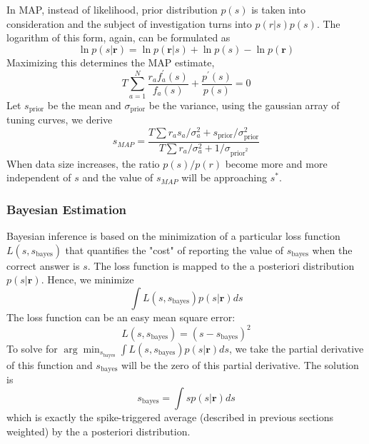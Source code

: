 \documentclass[11pt]{article}
\begin{document}
In MAP, instead of likelihood, prior distribution $p(s)$ is taken into consideration and the subject of investigation turns into $p(r|s)p(s)$. The logarithm of this form, again, can be formulated as
\begin{equation*}
    \ln p(s|\mathbf{r})=\ln p(\mathbf{r}|s)+\ln p(s)-\ln p(\mathbf{r})
\end{equation*}
Maximizing this determines the MAP estimate,
\begin{equation*}
    T\sum_{a=1}^N \frac{r_a f_a^{'}(s)}{f_a(s)}+\frac{p^{'}(s)}{p(s)}=0
\end{equation*}
Let $s_{\text{prior}}$ be the mean and $\sigma_{\text{prior}}$ be the variance, using the gaussian array of tuning curves, we derive
\begin{equation*}
    s_{MAP}=\frac{T\sum r_as_a / \sigma_a^2+s_{\text{prior}}/\sigma_{\text{prior}}^2}{T\sum r_a/\sigma_a^2+1/\sigma_{\text{prior}^2}}
\end{equation*}
When data size increases, the ratio $p(s)/p(r)$ become more and more independent of $s$ and the value of $s_{MAP}$ will be approaching $s^*$.

\subsubsection{Bayesian Estimation}

Bayesian inference is based on the minimization of a particular loss function $L(s,s_{\text{bayes}})$ that quantifies the "cost" of reporting the value of $s_{\text{bayes}}$ when the correct answer is $s$. The loss function is mapped to the a posteriori distribution $p(s|\mathbf{r})$. Hence, we minimize\begin{equation*}
    \int L(s,s_{\text{bayes}})p(s|\mathbf{r})ds
\end{equation*}
The loss function can be an easy mean square error:
\begin{equation*}
    L(s,s_{\text{bayes}})=(s-s_{\text{bayes}})^2
\end{equation*}
To solve for $\arg \min_{s_{\text{bayes}}} \int L(s,s_{\text{bayes}})p(s|\mathbf{r})ds$, we take the partial derivative of this function and $s_{\text{bayes}}$ will be the zero of this partial derivative. The solution is
\begin{equation*}
    s_{\text{bayes}}=\int sp(s|\mathbf{r})ds
\end{equation*}
which is exactly the spike-triggered average (described in previous sections weighted) by the a posteriori distribution.
\end{document}
